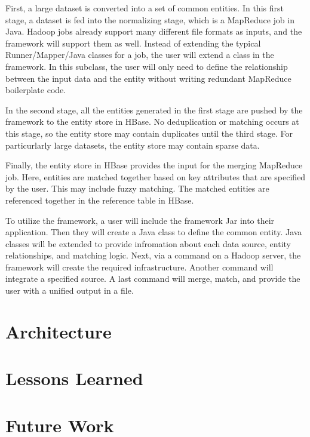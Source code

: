 \documentclass[12pt]{article}
\begin{document}
First, a large dataset is converted into a set of common entities.
In this first stage, a dataset is fed into the normalizing stage, which is a MapReduce job in Java. Hadoop jobs already support many different file formats as inputs, and the framework will support them as well. Instead of extending the typical Runner/Mapper/Java classes for a job, the user will extend a class in the framework. In this subclass, the user will only need to define the relationship between the input data and the entity without writing redundant MapReduce boilerplate code.

In the second stage, all the entities generated in the first stage are pushed by the framework to the entity store in HBase. No deduplication or matching occurs at this stage, so the entity store may contain duplicates until the third stage. For particurlarly large datasets, the entity store may contain sparse data.

Finally, the entity store in HBase provides the input for the merging MapReduce job. Here, entities are matched together based on key attributes that are specified by the user. This may include fuzzy matching. The matched entities are referenced together in the reference table in HBase.

To utilize the framework, a user will include the framework Jar into their application. Then they will create a Java class to define the common entity. Java classes will be extended to provide infromation about each data source, entity relationships, and matching logic. Next, via a command on a Hadoop server, the framework will create the required infrastructure. Another command will integrate a specified source. A last command will merge, match, and provide the user with a unified output in a file.

\section{Architecture}

\section{Lessons Learned}

\section{Future Work}
\end{document}
